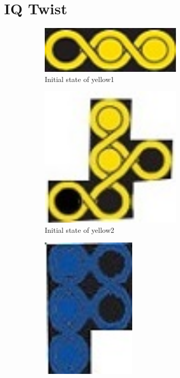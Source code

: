 \section{IQ Twist}
\begin{figure}[htbp]
\begin{subfigure}[b]{.24\textwidth}
\centering
\includegraphics[width=0.75\textwidth]{figs/yellow1.jpg}
\caption{Initial state of yellow1}
  \label{fig:2Dyellow1}
\end{subfigure}
\begin{subfigure}[b]{.24\textwidth}
\centering
\includegraphics[width=0.75\textwidth]{figs/yellow2.jpg}
\caption{Initial state of yellow2}
  \label{fig:2Dyellow2}
\end{subfigure}
\begin{subfigure}[b]{.24\textwidth}
\centering
\includegraphics[width =0.5\textwidth]{figs/blue1.jpg}

\end{subfigure}
\end{figure}

